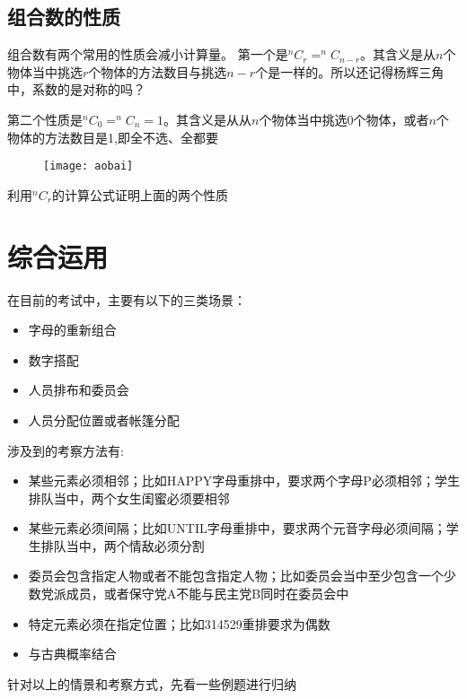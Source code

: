 \subsection*{组合数的性质}
组合数有两个常用的性质会减小计算量。
第一个是$^{n}C_{r}=^{n}C_{n-r}$。其含义是从$n$个物体当中挑选$r$个物体的方法数目与挑选$n-r$个是一样的。所以还记得杨辉三角中，系数的是对称的吗？

第二个性质是$^{n}C_{0}=^{n}C_{n}=1$。其含义是从从$n$个物体当中挑选$0$个物体，或者$n$个物体的方法数目是1,即全不选、全都要
\begin{figure}[H]
\centering
\texttt{[image: aobai]}
\end{figure}

\begin{TaskBox}
利用$^{n}C_{r}$的计算公式证明上面的两个性质
\end{TaskBox}
\clearpage

\section{综合运用}
在目前的考试中，主要有以下的三类场景：
\begin{itemize}
	\item 字母的重新组合
	\item 数字搭配
	\item 人员排布和委员会
	\item 人员分配位置或者帐篷分配
\end{itemize}

涉及到的考察方法有:
\begin{itemize}
	\item 某些元素必须相邻；比如HAPPY字母重排中，要求两个字母P必须相邻；学生排队当中，两个女生闺蜜必须要相邻
	\item 某些元素必须间隔；比如UNTIL字母重排中，要求两个元音字母必须间隔；学生排队当中，两个情敌必须分割
	\item 委员会包含指定人物或者不能包含指定人物；比如委员会当中至少包含一个少数党派成员，或者保守党A不能与民主党B同时在委员会中
	\item 特定元素必须在指定位置；比如314529重排要求为偶数
	\item 与古典概率结合
\end{itemize}

针对以上的情景和考察方式，先看一些例题进行归纳

